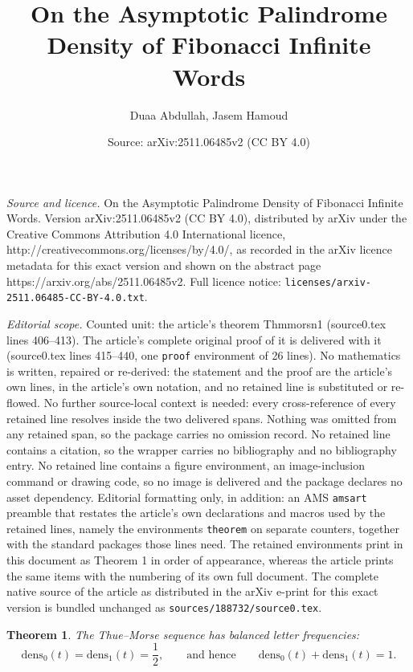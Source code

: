 \documentclass[10pt,a4paper]{amsart}
\title{On the Asymptotic Palindrome Density of Fibonacci Infinite Words}
\author{Duaa Abdullah, Jasem Hamoud}
\date{Source: arXiv:2511.06485v2 (CC BY 4.0)}
\newtheorem{theorem}{Theorem}
\begin{document}
\maketitle

\noindent\emph{Source and licence.} On the Asymptotic Palindrome Density of Fibonacci Infinite Words. Version arXiv:2511.06485v2 (CC BY 4.0), distributed by arXiv under the Creative Commons Attribution 4.0 International licence, http://creativecommons.org/licenses/by/4.0/, as recorded in the arXiv licence metadata for this exact version and shown on the abstract page https://arxiv.org/abs/2511.06485v2. Full licence notice: \texttt{licenses/arxiv-2511.06485-CC-BY-4.0.txt}.\par\smallskip

\noindent\textit{Editorial scope.} Counted unit: the article's theorem Thmmorsn1 (source0.tex lines 406--413). The article's complete original proof of it is delivered with it (source0.tex lines 415--440, one \texttt{proof} environment of 26 lines). No mathematics is written, repaired or re-derived: the statement and the proof are the article's own lines, in the article's own notation, and no retained line is substituted or re-flowed.  No further source-local context is needed: every cross-reference of every retained line resolves inside the two delivered spans.  Nothing was omitted from any retained span, so the package carries no omission record.  No retained line contains a citation, so the wrapper carries no bibliography and no bibliography entry.  No retained line contains a figure environment, an image-inclusion command or drawing code, so no image is delivered and the package declares no asset dependency.  Editorial formatting only, in addition: an AMS \texttt{amsart} preamble that restates the article's own declarations and macros used by the retained lines, namely the environments \texttt{theorem} on separate counters, together with the standard packages those lines need.  The retained environments print in this document as Theorem 1 in order of appearance, whereas the article prints the same items with the numbering of its own full document.  The complete native source of the article as distributed in the arXiv e-print for this exact version is bundled unchanged as \texttt{sources/188732/source0.tex}.
\begin{theorem}\label{Thmmorsn1}
The Thue--Morse sequence has balanced letter frequencies:
\begin{equation}\label{eq1Thmmorsn1}
\mathrm{dens}_0(t) = \mathrm{dens}_1(t) = \frac{1}{2},
\qquad\text{and hence}\qquad
\mathrm{dens}_0(t) + \mathrm{dens}_1(t) = 1.
\end{equation}
\end{theorem}
\end{document}
